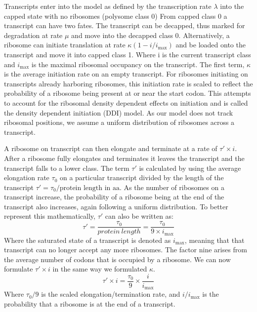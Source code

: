 \documentclass[review]{elsarticle}
\newcommand{\imax}{\ensuremath{i_{\max}}\xspace}
\begin{document}
Transcripts enter into the model as defined by the transcription rate $\lambda$ into the capped state with no ribosomes (polysome class 0)
From capped class 0 a transcript can have two fates. 
The transcript can be decapped, thus marked for degradation at rate $\mu$ and move into the decapped class 0.
Alternatively, a ribosome can initiate translation at rate $\kappa(1-i/\imax)$ and be loaded onto the transcript and move it into capped class 1.
Where i is the current transcript class and \imax is the maximal ribosomal occupancy on the transcript. 
The first term, $\kappa$ is the average initiation rate on an empty transcript. 
For ribosomes initiating on transcripts already harboring ribosomes, this initiation rate is scaled to reflect the probability of a ribosome being present at or near the start codon. 
This attempts to account for the ribosomal density dependent effects on initiation and is called the density dependent initiation (DDI) model.
As our model does not track ribosomal positions, we assume a uniform distribution of ribosomes across a transcript.

A ribosome on transcript can then elongate and terminate at a rate of $\tau' \times  i$. After a ribosome fully elongates and terminates it leaves the transcript and the transcript falls to a lower class.
The term $\tau'$ is calculated by using the average elongation rate $\tau_0$ on a particular transcript divided by the length of the transcript $\tau'=\tau_0/\text{protein length in aa}$.
As the number of ribosomes on a transcript increase, the probability of a ribosome being at the end of the transcript also increases, again following a uniform distribution. 
To better represent this mathematically, $\tau'$ can also  be written as:
\begin{equation}
	\tau' = \frac{\tau_0}{protein \: length} = \frac{\tau_0}{9\times \imax}
\end{equation}
Where the saturated state of a transcript is denoted as \imax, meaning that that transcript can no longer accept any more ribosomes. The factor nine arises from the average number of codons that is occupied by a ribosome. 
We can now formulate $\tau' \times i$ in the same way we formulated $\kappa$. 
\begin{equation}
	\tau' \times i = \frac{\tau_0}{9} \times \frac{i}{\imax}
\end{equation}
Where $\tau_0/9$ is the scaled elongation/termination rate, and $i/\imax$ is the probability that a ribosome is at the end of a transcript.
\end{document}

